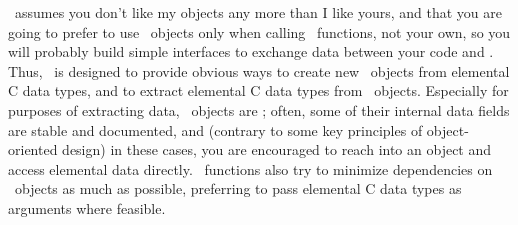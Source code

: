 \Easel\ assumes you don't like my objects any more than I like yours,
and that you are going to prefer to use \Easel\ objects only when
calling \Easel\ functions, not your own, so you will probably build
simple interfaces to exchange data between your code and \Easel. Thus,
\Easel\ is designed to provide obvious ways to create new \Easel\
objects from elemental C data types, and to extract elemental C data
types from \Easel\ objects. Especially for purposes of extracting
data, \Easel\ objects are \esldef{translucent}; often, some of their
internal data fields are stable and documented, and (contrary to some
key principles of object-oriented design) in these cases, you are
encouraged to reach into an object and access elemental data
directly. \Easel\ functions also try to minimize dependencies on
\Easel\ objects as much as possible, preferring to pass elemental C
data types as arguments where feasible.


